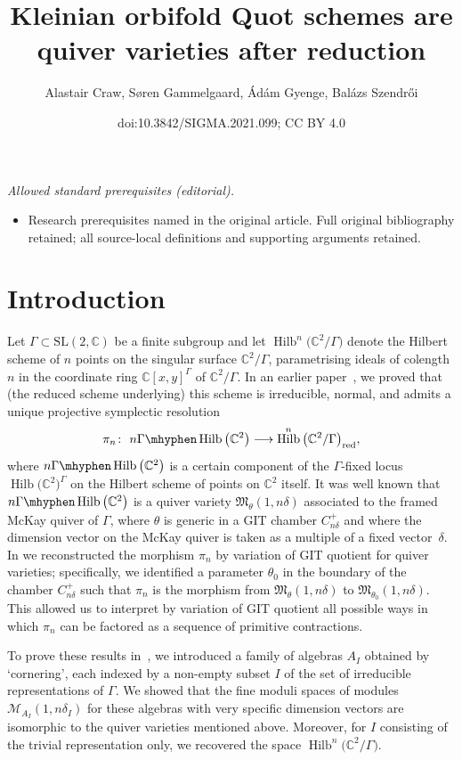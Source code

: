 \documentclass[10pt,a4paper]{amsart}
\title{Kleinian orbifold Quot schemes are quiver varieties after reduction}
\author{Alastair Craw, Søren Gammelgaard, Ádám Gyenge, Balázs Szendrői}
\date{doi:10.3842/SIGMA.2021.099; CC BY 4.0}
\newcommand{\SC}{\mathbb{C}} %
\newcommand{\PiQ}{A}
\DeclareMathOperator{\Hilb}{\mathrm{Hilb}}
\numberwithin{equation}{section}
\newcommand{\ngammahilb}{n\Gamma\mhyphen\Hilb\big(\SC^2\big)}
\begin{document}
\maketitle
\noindent\textit{Allowed standard prerequisites (editorial).}\begin{itemize}
\item Research prerequisites named in the original article. Full original bibliography retained; all source-local definitions and supporting arguments retained.
\end{itemize}\medskip
\section{Introduction}\label{sec:intro}

Let $\Gamma\subset{\mathrm{SL}}(2,\SC)$ be a finite subgroup and let $\Hilb^n\big(\SC^2/\Gamma\big)$ denote the Hilbert scheme of $n$ points on the singular surface $\SC^2/\Gamma$, parametrising
ideals of colength $n$ in the coordinate ring $\SC[x,y]^\Gamma$ of $\SC^2/\Gamma$. In an earlier paper~\cite{craw2019punctual}, we proved that (the reduced scheme underlying) this scheme is irreducible, normal, and admits a unique projective symplectic resolution
\[ \pi_n\colon \ \ngammahilb \longrightarrow \Hilb^n\big(\SC^2/\Gamma\big)_{\rm red},
\]
where $\ngammahilb$ is a certain component of the $\Gamma$-fixed locus
$\Hilb\big(\SC^2\big)^\Gamma$ on the Hilbert scheme of points on
$\SC^2$ itself. It was well known that $\ngammahilb$ is a quiver variety $\mathfrak{M}_{\theta}(1,n\delta)$ associated to the framed McKay quiver of $\Gamma$, where $\theta$ is generic in a GIT chamber $C_{n \delta}^+$ and where the dimension vector on the McKay quiver is taken as a multiple of a fixed vector~$\delta$.
In \cite[Theorem~1.1]{craw2019punctual} we reconstructed
the morphism $\pi_n$ by variation of GIT quotient for quiver varieties; specifically, we identified a parameter $\theta_0$ in the boundary of the chamber $C_{n \delta}^+$ such that $\pi_n$ is the morphism from $\mathfrak{M}_{\theta}(1,n\delta)$ to $\mathfrak{M}_{\theta_0}(1,n\delta)$. This allowed us to interpret by variation of GIT quotient all possible ways in which $\pi_n$ can be factored as a sequence of primitive contractions.

To prove these results in~\cite{craw2019punctual}, we introduced
a family of algebras $\PiQ_I$ obtained by `cornering', each
indexed by a non-empty subset $I$ of the set of irreducible
representations of $\Gamma$. We showed
that the fine moduli spaces of modules $\mathcal{M}_{\PiQ_I}(1,n\delta_I)$
for these algebras with very specific dimension vectors
are isomorphic to the quiver varieties mentioned above.
Moreover, for $I$ consisting of the trivial
representation only, we recovered the space $\Hilb^n\big(\SC^2/\Gamma\big)$.
\end{document}
